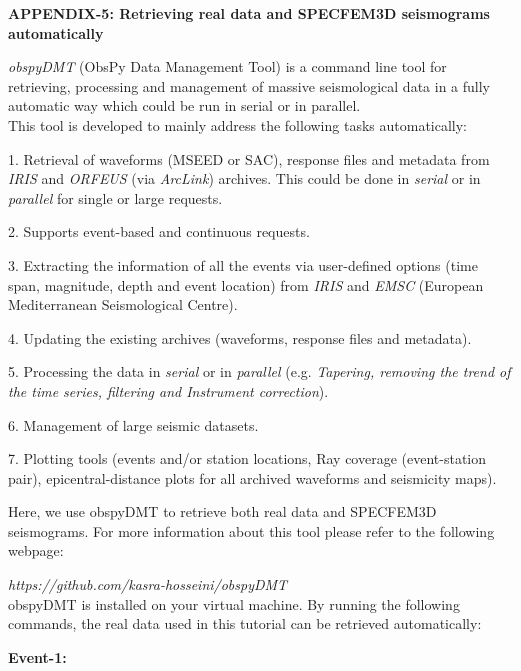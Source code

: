 \documentclass{article}
\begin{document}
\baselineskip=13pt
\leftskip=0pt

\newpage
{\large{}\textbf{APPENDIX-5: Retrieving real data and SPECFEM3D seismograms automatically}}

{\color{color18} \emph{obspyDMT}} (ObsPy Data Management Tool) is a command line 
tool for retrieving, processing and management of massive seismological data in 
a fully automatic way which could be run in serial or in parallel. \\

This tool is developed to mainly address the following tasks automatically:

1. Retrieval of waveforms (MSEED or SAC), response files and metadata from {\color{color18} \emph{IRIS}} 
and {\color{color18} \emph{ORFEUS}} (via {\color{color18} \emph{ArcLink}}) archives. 
This could be done in \textit{serial} or in \textit{parallel} for single or large 
requests.

2. Supports event-based and continuous requests.

3. Extracting the information of all the events via user-defined options (time 
span, magnitude, depth and event location) from {\color{color18} \emph{IRIS}} and 
{\color{color18} \emph{EMSC}} (European Mediterranean Seismological Centre).

4. Updating the existing archives (waveforms, response files and metadata).

5. Processing the data in \textit{serial} or in \textit{parallel} (e.g. \textit{Tapering, 
removing the trend of the time series, filtering and Instrument correction}).

6. Management of large seismic datasets.

7. Plotting tools (events and/or station locations, Ray coverage (event-station 
pair), epicentral-distance plots for all archived waveforms and seismicity maps).

\vspace{13pt}
Here, we use obspyDMT to retrieve both real data and SPECFEM3D seismograms. For 
more information about this tool please refer to the following webpage:

{\color{color18} \emph{https://github.com/kasra-hosseini/obspyDMT}}  \\

obspyDMT is installed on your virtual machine. By running the following commands, 
the real data used in this tutorial can be retrieved automatically:

\textbf{Event-1:}
\end{document}
